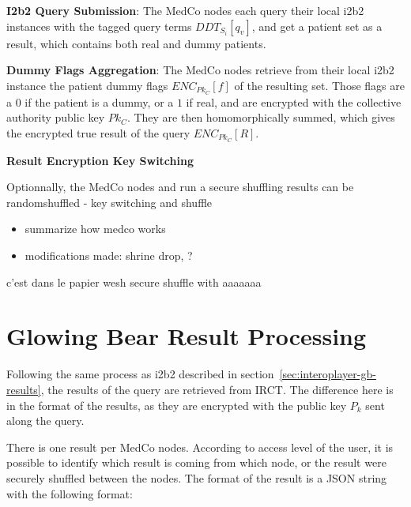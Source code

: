 \item \textbf{I2b2 Query Submission}:
The MedCo nodes each query their local i2b2 instances with the tagged query terms $DDT_{S_i}[q_v]$, and get a patient set as a result, which contains both real and dummy patients.

\item \textbf{Dummy Flags Aggregation}:
The MedCo nodes retrieve from their local i2b2 instance the patient dummy flags $ENC_{Pk_C}[f]$ of the resulting set.
Those flags are a $0$ if the patient is a dummy, or a $1$ if real, and are encrypted with the collective authority public key $Pk_C$.
They are then homomorphically summed, which gives the encrypted true result of the query $ENC_{Pk_C}[R]$.

\item \textbf{Result Encryption Key Switching}

Optionnally, the MedCo nodes and run a secure shuffling results can be randomshuffled 
- key switching and shuffle


\begin{itemize}
    \item summarize how medco works
    \item modifications made: shrine drop, ?
\end{itemize}

c'est dans le papier wesh
secure shuffle with aaaaaaa





\section{Glowing Bear Result Processing}

Following the same process as i2b2 described in section~\ref{sec:interoplayer-gb-results}, the results of the query are retrieved from IRCT.
The difference here is in the format of the results, as they are encrypted with the public key $P_k$ sent along the query.

There is one result per MedCo nodes.
According to access level of the user, it is possible to identify which result is coming from which node, or the result were securely shuffled between the nodes.
The format of the result is a JSON string with the following format:

